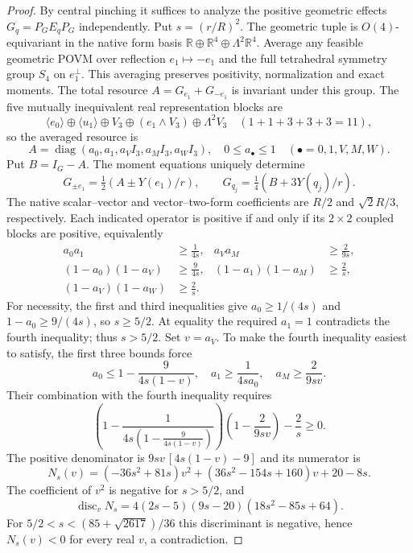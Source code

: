 \documentclass[12pt,a4paper]{article}
\begin{document}
\begin{proof}
By central pinching it suffices to analyze the positive geometric effects
$G_q=P_GE_qP_G$ independently. Put $s=(r/R)^2$. The geometric tuple is
$O(4)$-equivariant in the native form basis
$\mathbb R\oplus\mathbb R^4\oplus\Lambda^2\mathbb R^4$.
Average any feasible geometric POVM over reflection $e_1\mapsto-e_1$
and the full tetrahedral symmetry group $S_4$ on $e_1^\perp$.
This averaging preserves positivity, normalization and exact moments.
The total resource $A=G_{e_1}+G_{-e_1}$ is invariant under this group.
The five mutually inequivalent real representation blocks are
\[
\langle e_0\rangle\oplus\langle u_1\rangle
\oplus V_3\oplus(e_1\wedge V_3)\oplus\Lambda^2V_3
\quad(1+1+3+3+3=11),
\]
so the averaged resource is
\[
A=\operatorname{diag}(a_0,a_1,a_VI_3,a_MI_3,a_WI_3),\quad
0\le a_\bullet\le1\quad(\bullet=0,1,V,M,W).
\]
Put $B=I_G-A$. The moment equations uniquely determine
\[
G_{\pm e_1}=\tfrac12(A\pm Y(e_1)/r),\qquad
G_{q_j}=\tfrac14(B+3Y(q_j)/r).
\]
The native scalar--vector and vector--two-form coefficients are $R/2$
and $\sqrt2R/3$, respectively. Each indicated operator is positive
if and only if its $2\times2$ coupled blocks are positive, equivalently
\begin{align*}
a_0a_1&\ge\frac1{4s}, &a_Va_M&\ge\frac2{9s},\\
(1-a_0)(1-a_V)&\ge\frac9{4s},
 &(1-a_1)(1-a_M)&\ge\frac2s,\\
(1-a_V)(1-a_W)&\ge\frac2s.
\end{align*}
For necessity, the first and third inequalities give
$a_0\ge1/(4s)$ and $1-a_0\ge9/(4s)$, so $s\ge5/2$.
At equality the required $a_1=1$ contradicts the fourth inequality;
thus $s>5/2$. Set $v=a_V$. To make the fourth inequality easiest to
satisfy, the first three bounds force
\[
a_0\le1-\frac9{4s(1-v)},\quad
 a_1\ge\frac1{4sa_0},\quad a_M\ge\frac2{9sv}.
\]
Their combination with the fourth inequality requires
\[
\left(1-\frac1{4s\left(1-\frac9{4s(1-v)}\right)}\right)
\left(1-\frac2{9sv}\right)-\frac2s\ge0.
\]
The positive denominator is $9sv\,[4s(1-v)-9]$ and its numerator is
\[
N_s(v)=(-36s^2+81s)v^2+(36s^2-154s+160)v+20-8s.
\]
The coefficient of $v^2$ is negative for $s>5/2$, and
\[
\operatorname{disc}_v N_s
 =4(2s-5)(9s-20)(18s^2-85s+64).
\]
For $5/2<s<(85+\sqrt{2617})/36$ this discriminant is
negative, hence $N_s(v)<0$ for every real $v$, a contradiction.


\end{proof}
\end{document}
